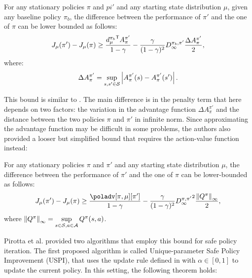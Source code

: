 \begin{theorem}\label{th:pirotta-bound1}
For any stationary policies $\pi$ and $pi'$ and any starting state distribution $\mu$, given any baseline policy $\pi_b$, the difference between the performance of $\pi'$ and the one of $\pi$ can be lower bounded as follows\footnotemark:
\begin{equation}
J_{\mu}(\pi') - J_\mu(\pi) \geq \frac{\transpose{d_\mu^{\pi_b}}A_\pi^{\pi'}}{1-\gamma} - \frac{\gamma}{(1-\gamma)^2}{D_\infty^{\pi_b, \pi'}} \frac{\Delta A_{\pi}^{\pi'}}{2},
\end{equation}
where:
\begin{equation}
\Delta A_{\pi}^{\pi'} = \sup_{s, s'\in\sspace}\left|{A_\pi^{\pi'}(s) - A_\pi^{\pi'}(s')}\right|.
\end{equation}
\end{theorem}

This bound is similar to . The main difference is in the penalty term that here depends on two factors: the variation in the advantage function $\Delta A_\pi^{\pi'}$ and the distance between the two policies $\pi$ and $\pi'$ in infinite norm. Since approximating the advantage function may be difficult in some problems, the authors also provided a looser but simplified bound that requires the action-value function instead:

\begin{theorem}
\label{th:pirotta-bound2}
For any stationary policies $\pi$ and $\pi'$ and any starting state distribution $\mu$, the difference between the performance of $\pi'$ and the one of $\pi$ can be lower-bounded as follows:
\begin{equation}
J_{\mu}(\pi') - J_\mu(\pi) \geq \frac{\poladv[\pi, \mu][\pi']}{1-\gamma} - \frac{\gamma}{(1-\gamma)^2}{D_\infty^{\pi, \pi'}}^2 \frac{\norm[\infty]{Q^\pi}}{2},
\end{equation}
where $\norm[\infty]{Q^{\pi}}=\sup\limits_{\substack{s\in\sspace, a\in\aspace}}Q^{\pi}(s,a)$.
\end{theorem}

Pirotta et al. provided two algorithms that employ this bound for safe policy iteration. The first proposed algorithm is called Unique-parameter Safe Policy Improvement (USPI), that uses the update rule defined in  with $\alpha\in [0,1]$ to update the current policy. In this setting, the following theorem holds:

